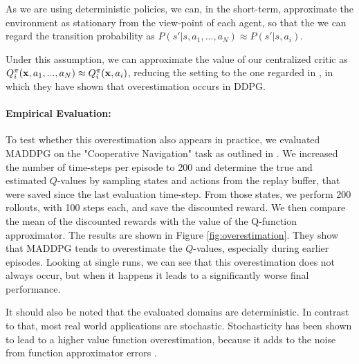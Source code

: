 \documentclass{article}
\renewcommand{\vec}[1]{\mathbf{\MakeLowercase{#1}}}
\newcommand{\action}{a}
\newcommand{\state}{s}
\newcommand{\transProb}{P}
\newcommand{\fullobservation}{\vec{x}}
\begin{document}
As we are using deterministic policies, we can, in the short-term, approximate the environment as stationary from the view-point of each agent, so that the we can regard the transition probability as $\transProb(\state'|\state,\action_1,...,\action_N) \approx \transProb(\state'|\state,\action_i)$.

Under this assumption, we can approximate the value of our centralized critic as $Q_i^\pi(\fullobservation, \action_1,...,\action_N) \approx Q_i^\pi(\fullobservation, \action_i)$, reducing the setting to the one regarded in \cite{Fujimoto2018}, in which they have shown that overestimation occurs in \gls*{DDPG}.
\paragraph{Empirical Evaluation:}

To test whether this overestimation also appears in practice, we evaluated \gls*{MADDPG} on the "Cooperative Navigation" task as outlined in \cite{Lowe2017}.
We increased the number of time-steps per episode to 200 and determine the true and estimated $Q$-values by sampling states and actions from the replay buffer, that were saved since the last evaluation time-step.
From those states, we perform 200 rollouts, with 100 steps each, and save the discounted reward.
We then compare the mean of the discounted rewards with the value of the Q-function approximator.
The results are shown in Figure \ref{fig:overestimation}. 
They show that \gls*{MADDPG} tends to overestimate the $Q$-values, especially during earlier episodes.
Looking at single runs, we can see that this overestimation does not always occur, but when it happens it leads to a significantly worse final performance.

It should also be noted that the evaluated domains are deterministic. 
In contrast to that, most real world applications are stochastic.
Stochasticity has been shown to lead to a higher value function overestimation, because it adds to the noise from function approximator errors \cite{VanHasselt2010}.
\end{document}
